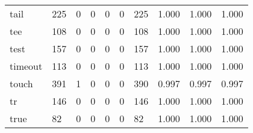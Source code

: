 \begin{longtable}{lp{1.3cm}p{1.3cm}p{1.3cm}p{1.3cm}p{1.3cm}p{1.3cm}p{1.3cm}p{1.3cm}p{1.3cm}}
tail      &                    225 &                                  0 &                                 0 &                                0 &                                 0 &                             225 &                                1.000 &                                  1.000 &                                1.000 \\
tee       &                    108 &                                  0 &                                 0 &                                0 &                                 0 &                             108 &                                1.000 &                                  1.000 &                                1.000 \\
test      &                    157 &                                  0 &                                 0 &                                0 &                                 0 &                             157 &                                1.000 &                                  1.000 &                                1.000 \\
timeout   &                    113 &                                  0 &                                 0 &                                0 &                                 0 &                             113 &                                1.000 &                                  1.000 &                                1.000 \\
touch     &                    391 &                                  1 &                                 0 &                                0 &                                 0 &                             390 &                                0.997 &                                  0.997 &                                0.997 \\
tr        &                    146 &                                  0 &                                 0 &                                0 &                                 0 &                             146 &                                1.000 &                                  1.000 &                                1.000 \\
true      &                     82 &                                  0 &                                 0 &                                0 &                                 0 &                              82 &                                1.000 &                                  1.000 &                                1.000 \\

\end{longtable}
